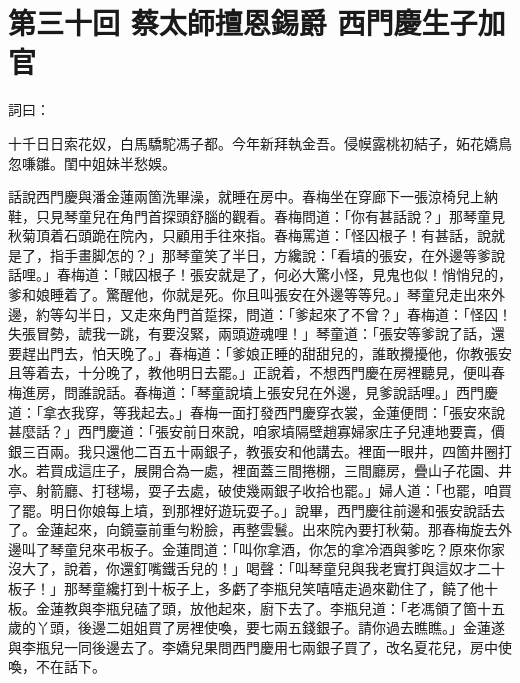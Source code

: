 
\chapter*{第三十回 蔡太師擅恩錫爵 西門慶生子加官}


詞曰：

\begin{myquote}
十千日日索花奴，白馬驕駝馮子都。今年新拜執金吾。侵幙露桃初結子，妬花嬌鳥忽嗛雛。閨中姐妹半愁娛。

\end{myquote}

話說西門慶與潘金蓮兩箇洗畢澡，就睡在房中。春梅坐在穿廊下一張涼椅兒上納鞋，只見琴童兒在角門首探頭舒腦的觀看。春梅問道：「你有甚話說？」那琴童見秋菊頂着石頭跪在院內，只顧用手往來指。{}春梅罵道：「怪囚根子！有甚話，說就是了，指手畫脚怎的？」那琴童笑了半日，方纔說：「看墳的張安，在外邊等爹說話哩。」春梅道：「賊囚根子！張安就是了，何必大驚小怪，見鬼也似！悄悄兒的，爹和娘睡着了。驚醒他，你就是死。你且叫張安在外邊等等兒。」琴童兒走出來外邊，約等勾半日，又走來角門首踅探，問道：「爹起來了不曾？」春梅道：「怪囚！失張冒勢，諕我一跳，有要沒緊，兩頭遊魂哩！」琴童道：「張安等爹說了話，還要趕出門去，怕天晚了。」春梅道：「爹娘正睡的甜甜兒的，誰敢攪擾他，你教張安且等着去，十分晚了，教他明日去罷。」正說着，不想西門慶在房裡聽見，便叫春梅進房，問誰說話。春梅道：「琴童說墳上張安兒在外邊，見爹說話哩。」西門慶道：「拿衣我穿，等我起去。」春梅一面打發西門慶穿衣裳，金蓮便問：「張安來說甚麼話？」西門慶道：「張安前日來說，咱家墳隔壁趙寡婦家庄子兒連地要賣，價銀三百兩。我只還他二百五十兩銀子，教張安和他講去。裡面一眼井，四箇井圈打水。{}若買成這庄子，展開合為一處，裡面蓋三間捲棚，三間廳房，疊山子花園、井亭、射箭廳、打毬場，耍子去處，破使幾兩銀子收拾也罷。」婦人道：「也罷，咱買了罷。明日你娘每上墳，到那裡好遊玩耍子。」說畢，西門慶往前邊和張安說話去了。金蓮起來，向鏡臺前重勻粉臉，再整雲鬟。出來院內要打秋菊。那春梅旋去外邊叫了琴童兒來弔板子。金蓮問道：「叫你拿酒，你怎的拿冷酒與爹吃？原來你家沒大了，說着，你還釘嘴鐵舌兒的！」喝聲：「叫琴童兒與我老實打與這奴才二十板子！」那琴童纔打到十板子上，多虧了李瓶兒笑嘻嘻走過來勸住了，饒了他十板。{}金蓮教與李瓶兒磕了頭，放他起來，廚下去了。李瓶兒道：「老馮領了箇十五歲的丫頭，後邊二姐姐買了房裡使喚，要七兩五錢銀子。請你過去瞧瞧。」金蓮遂與李瓶兒一同後邊去了。李嬌兒果問西門慶用七兩銀子買了，改名夏花兒，房中使喚，不在話下。

